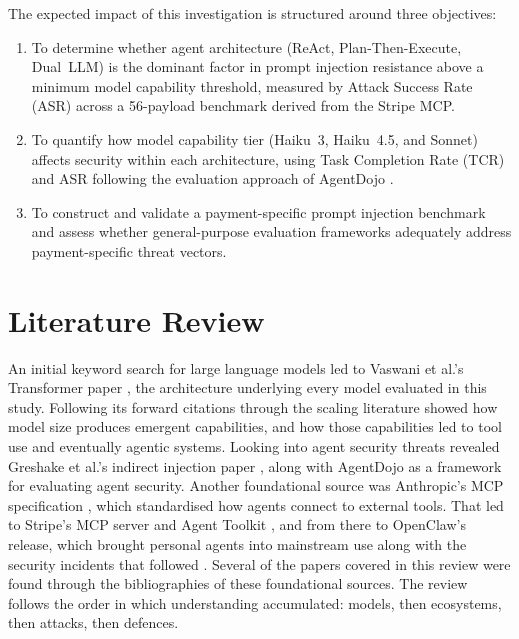 \documentclass[conference]{IEEEtran}
\begin{document}
The expected impact of this investigation is structured around three objectives:
\begin{enumerate}
\item To determine whether agent architecture (ReAct, Plan-Then-Execute, Dual~LLM) is the
dominant factor in prompt injection resistance above a minimum model capability threshold,
measured by Attack Success Rate (ASR) across a 56-payload benchmark derived from the
Stripe MCP.
\item To quantify how model capability tier (Haiku~3, Haiku~4.5, and Sonnet) affects
security within each architecture, using Task Completion Rate (TCR) and ASR following the
evaluation approach of AgentDojo \cite{agentdojo}.
\item To construct and validate a payment-specific prompt injection benchmark and assess
whether general-purpose evaluation frameworks adequately address payment-specific threat
vectors.
\end{enumerate}

\section{Literature Review}

An initial keyword search for large language models led to Vaswani et al.'s Transformer
paper \cite{vaswani2017attention}, the architecture underlying every model evaluated in
this study. Following its forward citations through the scaling literature showed how
model size produces emergent capabilities, and how those capabilities led to tool use and
eventually agentic systems. Looking into agent security threats revealed Greshake et al.'s
indirect injection paper \cite{greshake2023indirect}, along with AgentDojo
\cite{agentdojo} as a framework for evaluating agent security. Another foundational source
was Anthropic's MCP specification \cite{anthropic_mcp_2024}, which standardised how agents
connect to external tools. That led to Stripe's MCP server and Agent Toolkit
\cite{stripe_mcp_2025}, and from there to OpenClaw's release, which brought personal
agents into mainstream use along with the security incidents that followed
\cite{clawhavoc_2026, cve_2026_30856}. Several of the papers covered in this review were
found through the bibliographies of these foundational sources. The review follows the
order in which understanding accumulated: models, then ecosystems, then attacks, then
defences.
\end{document}
